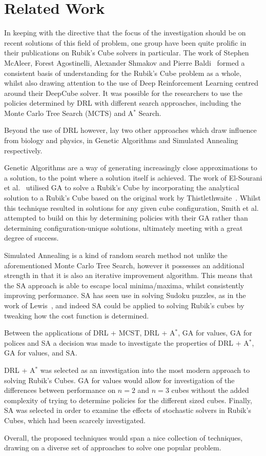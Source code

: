 \documentclass[UKenglish]{svproc}
\begin{document}
\section{Related Work}
In keeping with the directive that the focus of the investigation should be on recent solutions of this field of problem, one group have been quite prolific in their publications on Rubik's Cube solvers in particular. The work of Stephen McAleer, Forest Agostinelli, Alexander Shmakov and Pierre Baldi~\cite{mcaleer2018solving, mcaleer2019solving, agostinelli2019solving} formed a consistent basis of understanding for the Rubik's Cube problem as a whole, whilst also drawing attention to the use of Deep Reinforcement Learning centred around their DeepCube solver. It was possible for the researchers to use the policies determined by DRL with different search approaches, including the Monte Carlo Tree Search (MCTS) and A$^{\ast}$ Search.

Beyond the use of DRL however, lay two other approaches which draw influence from biology and physics, in Genetic Algorithms and Simulated Annealing respectively.

Genetic Algorithms are a way of generating increasingly close approximations to a solution, to the point where a solution itself is achieved. The work of El-Sourani et al.~\cite{10.1007/978-3-642-12239-2_9} utilised GA to solve a Rubik's Cube by incorporating the analytical solution to a Rubik's Cube based on the original work by Thistlethwaite~\cite{Thistlethwaite}. Whilst this technique resulted in solutions for any given cube configuration, Smith et al.~\cite{10.1145/2908812.2908887} attempted to build on this by determining policies with their GA rather than determining configuration-unique solutions, ultimately meeting with a great degree of success.

Simulated Annealing is a kind of random search method not unlike the aforementioned Monte Carlo Tree Search, however it possesses an additional strength in that it is also an iterative improvement algorithm. This means that the SA approach is able to escape local minima/maxima, whilst consistently improving performance. SA has seen use in solving Sudoku puzzles, as in the work of Lewis~\cite{SAarticle}, and indeed SA could be applied to solving Rubik's cubes by tweaking how the cost function is determined.

Between the applications of DRL + MCST, DRL + A$^{\ast}$, GA for values, GA for polices and SA a decision was made to investigate the properties of DRL + A$^{\ast}$, GA for values, and SA. \par DRL + A$^{\ast}$ was selected as an investigation into the most modern approach to solving Rubik's Cubes. GA for values would allow for investigation of the differences between performance on $n=2$ and $n=3$ cubes without the added complexity of trying to determine policies for the different sized cubes. Finally, SA was selected in order to examine the effects of stochastic solvers in Rubik's Cubes, which had been scarcely investigated. \par Overall, the proposed techniques would span a nice collection of techniques, drawing on a diverse set of approaches to solve one popular problem.
\end{document}
